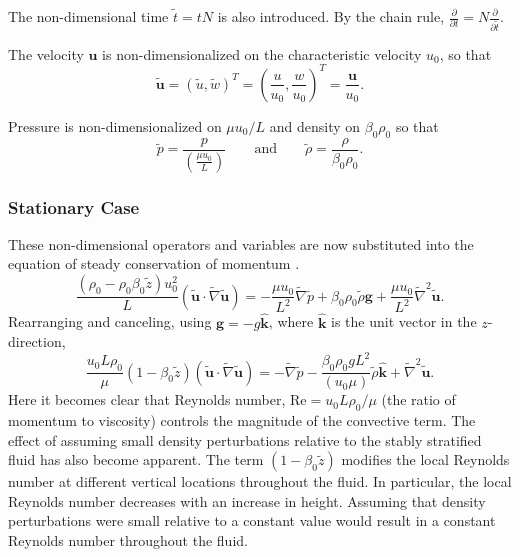 \documentclass[12pt]{article}
\begin{document}
The non-dimensional time $\tilde{t} = tN$ is also introduced. By the chain rule, $\frac{\partial}{\partial t}=N\frac{\partial}{\partial\tilde{t}}$.

The velocity $\mathbf{u}$ is non-dimensionalized on the characteristic velocity $u_0$, so that
\begin{equation}
\mathbf{\tilde{u}}=(\tilde{u}, \tilde{w})^T=\left(\frac{u}{u_0}, \frac{w}{u_0}\right)^T=\frac{\mathbf{u}}{u_0}.
\end{equation}

Pressure is non-dimensionalized on $\mu u_0/L$ and density on $\beta_0\rho_0$ so that
\begin{equation}
\tilde{p}=\frac{p}{\left(\frac{\mu u_0}{L}\right)} \qquad\text{and}\qquad \tilde{\rho}=\frac{\rho}{\beta_0\rho_0}.
\end{equation}

\subsubsection{Stationary Case}

These non-dimensional operators and variables are now substituted into the equation of steady conservation of momentum .
\begin{equation}
\frac{(\rho_0-\rho_0\beta_0\tilde{z})u_0^2}{L}(\mathbf{\tilde{u}}\cdot\tilde{\nabla}\mathbf{\tilde{u}})=-\frac{\mu u_0}{L^2}\tilde{\nabla}\tilde{p}+\beta_0\rho_0\tilde{\rho}\mathbf{g}+\frac{\mu u_0}{L^2}\tilde{\nabla}^2\mathbf{\tilde{u}}.
\end{equation}
Rearranging and canceling, using $\mathbf{g}=-g\mathbf{\hat{k}}$, where $\mathbf{\hat{k}}$ is the unit vector in the $z$-direction, 
\begin{equation}
\frac{u_0L\rho_0}{\mu}(1-\beta_0\tilde{z})(\mathbf{\tilde{u}}\cdot\tilde{\nabla}\mathbf{\tilde{u}})=-\tilde{\nabla}\tilde{p}-\frac{\beta_0\rho_0gL^2}{(u_0\mu)}\tilde{\rho}\mathbf{\hat{k}}+\tilde{\nabla}^2\mathbf{\tilde{u}}.
\end{equation}
Here it becomes clear that Reynolds number, $\text{Re}=u_0L\rho_0/\mu$ (the ratio of momentum to viscosity) controls the magnitude of the convective term. The effect of assuming small density perturbations relative to the stably stratified fluid has also become apparent. The term $(1-\beta_0\tilde{z})$ modifies the local Reynolds number at different vertical locations throughout the fluid. In particular, the local Reynolds number decreases with an increase in height. Assuming that density perturbations were small relative to a constant value would result in a constant Reynolds number throughout the fluid.
\end{document}
